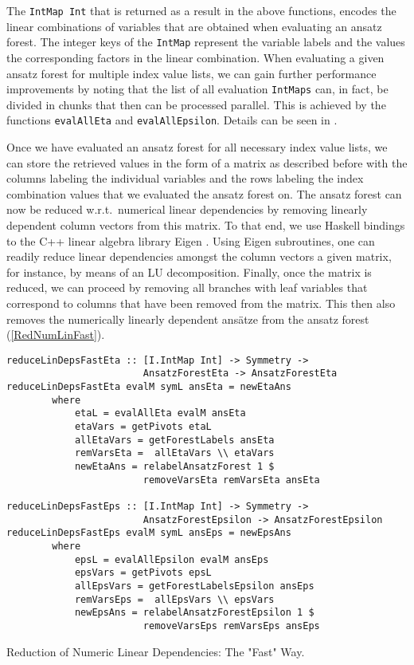 The \texttt{IntMap Int} that is returned as a result in the above functions, encodes the linear combinations of variables that are obtained when evaluating an ansatz forest. The integer keys of the \texttt{IntMap} represent the variable labels and the values the corresponding factors in the linear combination. 
When evaluating a given ansatz forest for multiple index value lists, we can gain further performance improvements by noting that the list of all evaluation \texttt{IntMaps} can, in fact, be divided in chunks that then can be processed parallel. This is achieved by the functions \texttt{evalAllEta} and \texttt{evalAllEpsilon}. Details can be seen in \cite{sparse-tensor}.

Once we have evaluated an ansatz forest for all necessary index value lists, we can store the retrieved values in the form of a matrix as described before with the columns labeling the individual variables and the rows labeling the index combination values that we evaluated the ansatz forest on. The ansatz forest can now be reduced w.r.t.\ numerical linear dependencies by removing linearly dependent column vectors from this matrix. To that end, we use Haskell bindings \cite{HackageEigen} to the C++ linear algebra library Eigen \cite{eigenweb}. Using Eigen subroutines, one can readily reduce linear dependencies amongst the column vectors a given matrix, for instance, by means of an LU decomposition. Finally, once the matrix is reduced, we can proceed by removing all branches with leaf variables that correspond to columns that have been removed from the matrix. This then also removes the numerically linearly dependent ansätze from the ansatz forest (\ref{RedNumLinFast}).
\begin{listing}[hbt!]
\begin{verbatim}
reduceLinDepsFastEta :: [I.IntMap Int] -> Symmetry ->
                        AnsatzForestEta -> AnsatzForestEta
reduceLinDepsFastEta evalM symL ansEta = newEtaAns
        where
            etaL = evalAllEta evalM ansEta
            etaVars = getPivots etaL
            allEtaVars = getForestLabels ansEta
            remVarsEta =  allEtaVars \\ etaVars
            newEtaAns = relabelAnsatzForest 1 $
                        removeVarsEta remVarsEta ansEta

reduceLinDepsFastEps :: [I.IntMap Int] -> Symmetry ->
                        AnsatzForestEpsilon -> AnsatzForestEpsilon
reduceLinDepsFastEps evalM symL ansEps = newEpsAns
        where
            epsL = evalAllEpsilon evalM ansEps
            epsVars = getPivots epsL
            allEpsVars = getForestLabelsEpsilon ansEps
            remVarsEps =  allEpsVars \\ epsVars
            newEpsAns = relabelAnsatzForestEpsilon 1 $
                        removeVarsEps remVarsEps ansEps 
\end{verbatim} 
\caption{Reduction of Numeric Linear Dependencies: The "Fast" Way.}\label{RedNumLinFast}
\end{listing}

